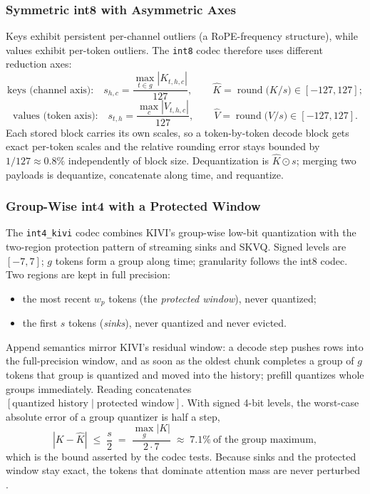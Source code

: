 \subsubsection{Symmetric int8 with Asymmetric Axes}

Keys exhibit persistent per-channel outliers (a RoPE-frequency structure), while values exhibit per-token outliers. The \texttt{int8} codec therefore uses different reduction axes:
\[
\text{keys (channel axis):}\quad s_{h,c} = \frac{\max_{t\in g}|K_{t,h,c}|}{127},\qquad \hat{K} = \operatorname{round}\!\big(K/s\big)\in[-127,127];
\]
\[
\text{values (token axis):}\quad s_{t,h} = \frac{\max_{c}|V_{t,h,c}|}{127},\qquad \hat{V} = \operatorname{round}\!\big(V/s\big)\in[-127,127].
\]
Each stored block carries its own scales, so a token-by-token decode block gets exact per-token scales and the relative rounding error stays bounded by $1/127\approx 0.8\%$ independently of block size. Dequantization is $\hat{K}\odot s$; merging two payloads is dequantize, concatenate along time, and requantize.

\subsubsection{Group-Wise int4 with a Protected Window}

The \texttt{int4\_kivi} codec combines KIVI's group-wise low-bit quantization with the two-region protection pattern of streaming sinks and SKVQ. Signed levels are $[-7,7]$; $g$ tokens form a group along time; granularity follows the int8 codec. Two regions are kept in full precision:
\begin{itemize}[leftmargin=*]
    \item the most recent $w_p$ tokens (the \emph{protected window}), never quantized;
    \item the first $s$ tokens (\emph{sinks}), never quantized and never evicted.
\end{itemize}
Append semantics mirror KIVI's residual window: a decode step pushes rows into the full-precision window, and as soon as the oldest chunk completes a group of $g$ tokens that group is quantized and moved into the history; prefill quantizes whole groups immediately. Reading concatenates $[\text{quantized history}\mid\text{protected window}]$. With signed 4-bit levels, the worst-case absolute error of a group quantizer is half a step,
\[
|K-\hat{K}| \;\le\; \frac{s}{2} \;=\; \frac{\max_{g}|K|}{2\cdot 7} \;\approx\; 7.1\%\ \text{of the group maximum},
\]
which is the bound asserted by the codec tests. Because sinks and the protected window stay exact, the tokens that dominate attention mass are never perturbed \citep{kivi_liu_2024,kvquant_hooper_2024,skvq_duanmu_2024,xiao_streaming_sinks_2024}.

